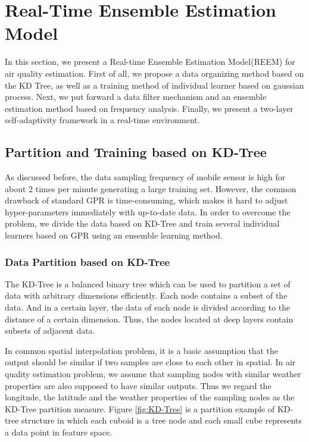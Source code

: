 \documentclass[twoside,leqno,twocolumn]{article}
\begin{document}

\section{Real-Time Ensemble Estimation Model}
In this section, we present a Real-time Ensemble Estimation Model(REEM) for air quality estimation. First of all, we propose a data organizing method based on the KD Tree, as well as a training method of individual learner based on gaussian process. Next, we put forward a data filter mechanism and an ensemble estimation method based on frequency analysis. Finally, we present a two-layer self-adaptivity framework in a real-time environment.

\subsection{Partition and Training based on KD-Tree}
As discussed before, the data sampling frequency of mobile sensor is high for about 2 times per minute generating a large training set. However, the common drawback of standard GPR is time-consuming, which makes it hard to adjust hyper-parameters immediately with up-to-date data.  In order to overcome the problem, we divide the data based on KD-Tree and train several individual learners based on GPR using an ensemble learning method.

\subsubsection{Data Partition based on KD-Tree}
The KD-Tree is a balanced binary tree which can be used to partition a set of data with arbitrary dimensions efficiently.  Each node contains a subset of the data. And in a certain layer, the data of each node is divided according to the distance of a certain dimension. Thus, the nodes located at deep layers contain subsets of adjacent data.

In common spatial interpolation problem, it is a basic assumption that the output should be similar if two samples are close to each other in spatial. In air quality estimation problem, we assume that sampling nodes with similar weather  properties are also supposed to have similar outputs. Thus we regard the longitude, the latitude and the weather properties of the sampling nodes as the KD-Tree partition measure. Figure  \ref{fig:KD-Tree} is a partition example of KD-tree structure in which each cuboid is a tree node and each small cube represents a data point in feature space.
\end{document}
